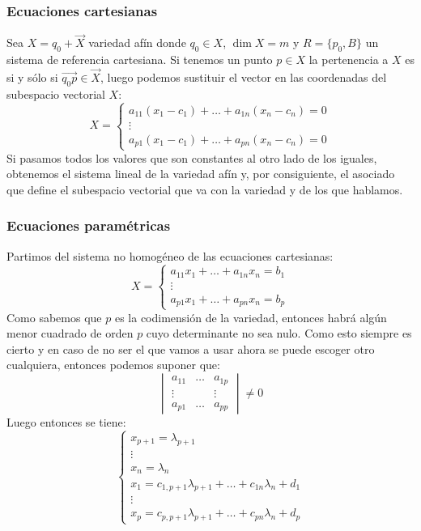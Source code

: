 \documentclass[10pt,a4paper,openright]{book}
\begin{document}
\subsubsection*{Ecuaciones cartesianas}
Sea $X= q_0 + \vec{X}$ variedad afín donde $q_0 \in X$, $\dim X =m$ y $R= \{p_0, B\}$ un sistema de referencia cartesiana. Si tenemos un punto $p \in X$ la pertenencia a $X$ es si y sólo si $\vec{q_0 p} \in \vec{X}$, luego podemos sustituir el vector en las coordenadas del subespacio vectorial $X$:
$$X =\begin{cases} a_{11} (x_1 - c_1) + \ldots + a_{1n} (x_n - c_n) = 0 \\ \vdots \\  a_{p1} (x_1 - c_1) + \ldots + a_{pn} (x_n - c_n) = 0 \end{cases}$$
Si pasamos todos los valores que son constantes al otro lado de los iguales, obtenemos el sistema lineal de la variedad afín y, por consiguiente, el asociado que define el subespacio vectorial que va con la variedad y de los que hablamos.

\subsubsection*{Ecuaciones paramétricas}
Partimos del sistema no homogéneo de las ecuaciones cartesianas:
$$X = \begin{cases} a_{11}x_1 + \ldots +  a_{1n}x_n = b_1 \\ \vdots \\  a_{p1}x_1 + \ldots + a_{pn}x_n = b_p \end{cases}$$
Como sabemos que $p$ es la codimensión de la variedad, entonces habrá algún menor cuadrado de orden $p$ cuyo determinante no sea nulo. Como esto siempre es cierto y en caso de no ser el que vamos a usar ahora se puede escoger otro cualquiera, entonces podemos suponer que:
$$\begin{vmatrix} a_{11} & \ldots & a_{1p} \\ \vdots & & \vdots \\ a_{p1} & \ldots & a_{pp} \end{vmatrix} \neq 0 $$
Luego entonces se tiene:
$$\begin{cases} x_{p+1} = \lambda_{p+1} \\ \vdots \\ x_n = \lambda_n \\ x_1 = c_{1, p+1} \lambda_{p+1} + \ldots + c_{1n} \lambda_n + d_1 \\ \vdots \\ x_p = c_{p,p+1} \lambda_{p+1} + \ldots + c_{pn} \lambda_n + d_p \end{cases}$$
\end{document}
